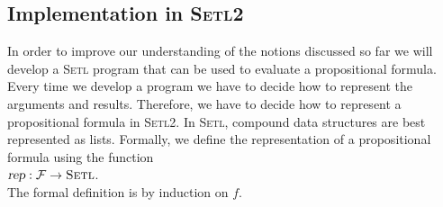 \subsection{Implementation in \textsc{Setl2}} 
In order to improve our understanding of the notions discussed so far we will develop
a \textsc{Setl} program that can be used to evaluate a propositional formula.
Every time we develop a program we have to decide how to represent the arguments and results.
Therefore, we have to decide how to represent a propositional formula in \textsc{Setl2}.
In \textsc{Setl}, compound data structures are best represented as lists.  Formally, we define
the representation of a propositional formula using the function
\\[0.2cm]
\hspace*{1.3cm}
$\textsl{rep}: \mathcal{F} \rightarrow \textsc{Setl}$.
\\[0.2cm]
The formal definition is by induction on $f$.

